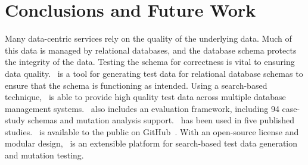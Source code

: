 \section{Conclusions and Future Work}\label{sec:conclusion}

Many data-centric services rely on the quality of the underlying data. Much of this data is managed by relational
databases, and the database schema protects the integrity of the data.  Testing the schema for correctness is vital to
ensuring data quality. \sa~is a tool for generating test data for relational database schemas to ensure that the schema
is functioning as intended. Using a search-based technique, \sa~is able to provide high quality test data across
multiple database management systems. \sa~also includes an evaluation framework, including 94 case-study schemas and
mutation analysis support. \sa~has been used in five published studies.  \sa~is available to the public on
GitHub~\cite{tool}. With an open-source license and modular design, \sa~is an extensible platform for search-based test
data generation and mutation testing.
